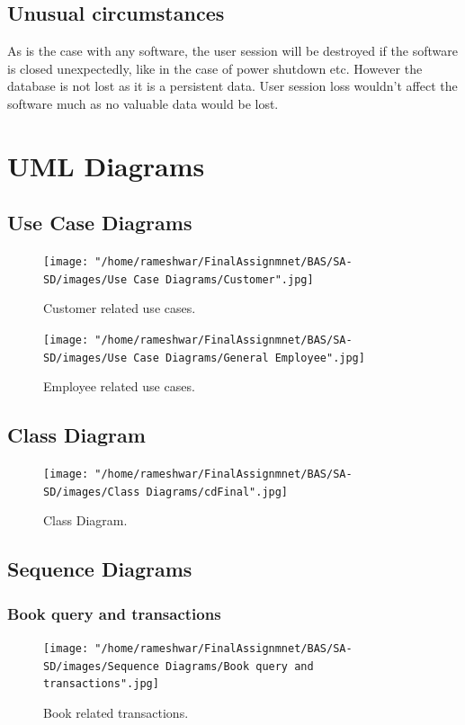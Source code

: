 \documentclass{scrreprt}
\begin{document}
\section{Unusual circumstances}
As is the case with any software, the user session will be destroyed if the software is closed unexpectedly, like in the case of power shutdown etc. However the database is not lost as it is a persistent data. User session loss wouldn't affect the software much as no valuable data would be lost.

\clearpage

\chapter{UML Diagrams}
\section{Use Case Diagrams}
\begin{figure}[!htb]
  \texttt{[image: "/home/rameshwar/FinalAssignmnet/BAS/SA-SD/images/Use Case Diagrams/Customer".jpg]}
  \caption{Customer related use cases.}
  \label{fig:usecase}
\end{figure}

\begin{figure}[!htb]
  \texttt{[image: "/home/rameshwar/FinalAssignmnet/BAS/SA-SD/images/Use Case Diagrams/General Employee".jpg]}
  \caption{Employee related use cases.}
  \label{fig:usecase1}
\end{figure}


\section{Class Diagram}
\begin{figure}[!htb]
  \texttt{[image: "/home/rameshwar/FinalAssignmnet/BAS/SA-SD/images/Class Diagrams/cdFinal".jpg]}
  \caption{Class Diagram.}
  \label{fig:classdiagram}
\end{figure}
\clearpage
\section{Sequence Diagrams}
\subsection{Book query and transactions}
\begin{figure}[!htb]
  \texttt{[image: "/home/rameshwar/FinalAssignmnet/BAS/SA-SD/images/Sequence Diagrams/Book query and transactions".jpg]}
  \caption{Book related transactions.}
  \label{fig:seqdiagram}
\end{figure}
\clearpage
\end{document}
